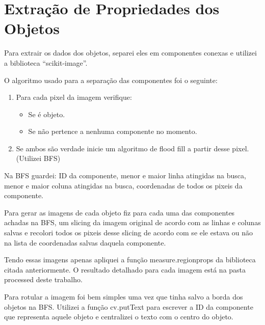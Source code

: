 \documentclass[12pt, letterpaper]{article}
\begin{document}
\section{Extração de Propriedades dos Objetos}
    Para extrair os dados dos objetos, separei eles em componentes conexas e utilizei a biblioteca ``scikit-image''.

    O algoritmo usado para a separação das componentes foi o seguinte:
    \begin{enumerate}
        \item{Para cada pixel da imagem verifique:}
        \begin{itemize}
            \item{Se é objeto.}
            \item{Se não pertence a nenhuma componente no momento.}
        \end{itemize}
        \item{Se ambos são verdade inicie um algoritmo de flood fill a partir desse pixel. (Utilizei BFS)}
    \end{enumerate}

    Na BFS guardei: ID da componente, menor e maior linha atingidas na busca, menor e maior coluna atingidas na busca, coordenadas de todos os pixeis da componente.

    Para gerar as imagens de cada objeto fiz para cada uma das componentes achadas na BFS, um slicing da imagem original de acordo com as linhas e colunas salvas e recolori todos os pixeis desse slicing de acordo com se ele estava ou não na lista de coordenadas salvas daquela componente.

    Tendo essas imagens apenas apliquei a função measure.regionprops da biblioteca citada anteriormente. O resultado detalhado para cada imagem está na pasta processed deste trabalho.

    Para rotular a imagem foi bem simples uma vez que tinha salvo a borda dos objetos na BFS. Utilizei a função cv.putText para escrever a ID da componente que representa aquele objeto e centralizei o texto com o centro do objeto.
\end{document}
